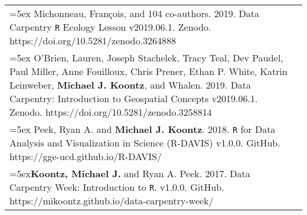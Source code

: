 \begin{longtable}{@{} >{\raggedright}p{6.10in} >{\raggedleft}X @{}}

\hangindent=5ex Michonneau, Fran\c{c}ois, and 104 co-authors. 2019. Data Carpentry \texttt{R} Ecology Lesson v2019.06.1. Zenodo. https://doi.org/10.5281/zenodo.3264888 \tabularnewline

\hangindent=5ex O'Brien, Lauren, Joseph Stachelek, Tracy Teal, Dev Paudel, Paul Miller, Anne Fouilloux, Chris Prener, Ethan P. White, Katrin Leinweber, \textbf{Michael J. Koontz}, and Whalen. 2019. Data Carpentry: Introduction to Geospatial Concepts v2019.06.1. Zenodo. https://doi.org/10.5281/zenodo.3258814 \tabularnewline

\hangindent=5ex Peek, Ryan A. and \textbf{Michael J. Koontz}. 2018. \texttt{R} for Data Analysis and Visualization in Science (R-DAVIS) v1.0.0. GitHub. https://gge-ucd.github.io/R-DAVIS/ \tabularnewline


\hangindent=5ex\textbf{Koontz, Michael J.} and Ryan A. Peek. 2017. Data Carpentry Week: Introduction to \texttt{R}. v1.0.0. GitHub. https://mikoontz.github.io/data-carpentry-week/ \tabularnewline

\end{longtable}